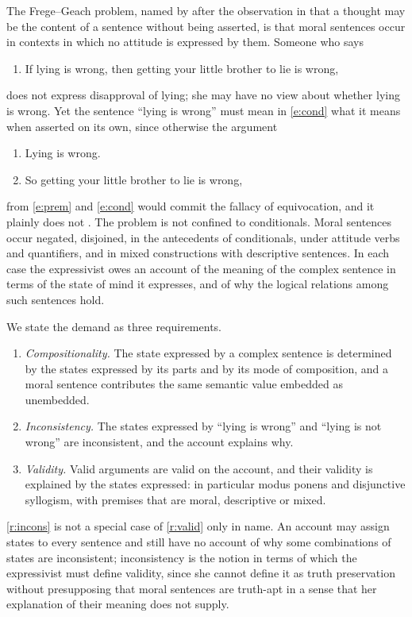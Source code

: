 \documentclass{situationist-preprint}
\begin{document}
The Frege--Geach problem, named by \citet{Geach1965} after the observation in \citet{Frege1919} that a thought may be the content of a sentence without being asserted, is that moral sentences occur in contexts in which no attitude is expressed by them. Someone who says
\begin{enumerate}[label=(\arabic*)]
\item\label{e:cond} If lying is wrong, then getting your little brother to lie is wrong,
\end{enumerate}
does not express disapproval of lying; she may have no view about whether lying is wrong. Yet the sentence \enquote{lying is wrong} must mean in \ref{e:cond} what it means when asserted on its own, since otherwise the argument
\begin{enumerate}[label=(\arabic*),resume]
\item\label{e:prem} Lying is wrong.
\item\label{e:concl} So getting your little brother to lie is wrong,
\end{enumerate}
from \ref{e:prem} and \ref{e:cond} would commit the fallacy of equivocation, and it plainly does not \citep{Geach1960,Geach1965,Searle1962}. The problem is not confined to conditionals. Moral sentences occur negated, disjoined, in the antecedents of conditionals, under attitude verbs and quantifiers, and in mixed constructions with descriptive sentences. In each case the expressivist owes an account of the meaning of the complex sentence in terms of the state of mind it expresses, and of why the logical relations among such sentences hold.

We state the demand as three requirements.
\begin{enumerate}[label=(R\arabic*)]
\item\label{r:comp} \emph{Compositionality.} The state expressed by a complex sentence is determined by the states expressed by its parts and by its mode of composition, and a moral sentence contributes the same semantic value embedded as unembedded.
\item\label{r:incons} \emph{Inconsistency.} The states expressed by \enquote{lying is wrong} and \enquote{lying is not wrong} are inconsistent, and the account explains why.
\item\label{r:valid} \emph{Validity.} Valid arguments are valid on the account, and their validity is explained by the states expressed: in particular modus ponens and disjunctive syllogism, with premises that are moral, descriptive or mixed.
\end{enumerate}
\ref{r:incons} is not a special case of \ref{r:valid} only in name. An account may assign states to every sentence and still have no account of why some combinations of states are inconsistent; inconsistency is the notion in terms of which the expressivist must define validity, since she cannot define it as truth preservation without presupposing that moral sentences are truth-apt in a sense that her explanation of their meaning does not supply.
\end{document}
